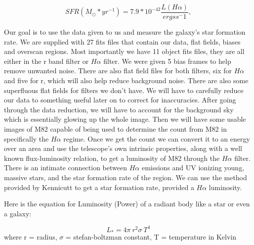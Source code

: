 \documentclass[modern]{aastex63}
\begin{document}
\begin{equation}\label{'Equation 7'}
SFR(M_{\odot} * yr^{-1}) = 7.9 * 10^{-42} \frac{L(H\alpha)}{ergs s^-{1}}, 
\end{equation}

Our goal is to use the data given to us and measure the galaxy's star formation rate. We are supplied with 27 fits files that contain our data, flat fields, biases and overscan regions. Most importantly we have 11 object fits files, they are all either in the r band filter or $H\alpha$ filter. We were given 5 bias frames to help remove unwanted noise. There are also flat field files for both filters, six for $H\alpha$ and five for r, which will also help reduce background noise. There are also some superfluous flat fields for filters we don't have. We will have to carefully reduce our data to something useful later on to correct for inaccuracies. After going through the data reduction, we will have to account for the background sky which is essentially glowing up the whole image. Then we will have some usable images of M82 capable of being used to determine the count from M82 in specifically the $H\alpha$ regime. Once we get the count we can convert it to an energy over an area and use the telescope's own intrinsic properties, along with a well known flux-luminosity relation, to get a luminosity of M82 through the $H\alpha$ filter. There is an intimate connection between $H\alpha$ emissions and UV ionizing young, massive stars, and the star formation rate of the region. We can use the method provided by Kennicutt to get a star formation rate, provided a $H\alpha$ luminosity.

Here is the equation for Luminosity (Power) of a radiant body like a star or even a galaxy:

\begin{equation}\label{'Equation 1'}
L_* = 4 \pi\ r^2 \sigma\ T^4
\end{equation}  where r = radius, $\sigma$ = stefan-boltzman constant, T = temperature in Kelvin \citep{2001JRASC..95...32L}
\end{document}
